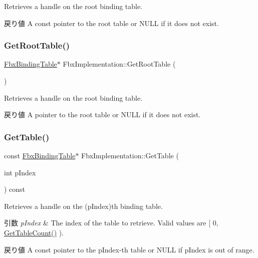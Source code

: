 Retrieves a handle on the root binding table. \begin{DoxyReturn}{戻り値}
A const pointer to the root table or N\+U\+LL if it does not exist. 
\end{DoxyReturn}
\mbox{\label{class_fbx_implementation_afc289e50527a2dfa6c977080721a8217}} 
\subsubsection{\texorpdfstring{Get\+Root\+Table()}{GetRootTable()}\hspace{0.1cm}{\footnotesize\ttfamily [2/2]}}
{\footnotesize\ttfamily \hyperlink{class_fbx_binding_table}{Fbx\+Binding\+Table}$\ast$ Fbx\+Implementation\+::\+Get\+Root\+Table (\begin{DoxyParamCaption}{ }\end{DoxyParamCaption})}

Retrieves a handle on the root binding table. \begin{DoxyReturn}{戻り値}
A pointer to the root table or N\+U\+LL if it does not exist. 
\end{DoxyReturn}
\mbox{\label{class_fbx_implementation_a0cbdb7d46ba4a42cdea6336ef859cc0a}} 
\subsubsection{\texorpdfstring{Get\+Table()}{GetTable()}\hspace{0.1cm}{\footnotesize\ttfamily [1/2]}}
{\footnotesize\ttfamily const \hyperlink{class_fbx_binding_table}{Fbx\+Binding\+Table}$\ast$ Fbx\+Implementation\+::\+Get\+Table (\begin{DoxyParamCaption}\item[{int}]{p\+Index }\end{DoxyParamCaption}) const}

Retrieves a handle on the (p\+Index)th binding table. 
\begin{DoxyParams}{引数}
{\em p\+Index} & The index of the table to retrieve. Valid values are \mbox{[} 0, \hyperlink{class_fbx_implementation_a36f67aeee13d4cc5d1523b9c36a44a50}{Get\+Table\+Count()} ). \\
\hline
\end{DoxyParams}
\begin{DoxyReturn}{戻り値}
A const pointer to the p\+Index-\/th table or N\+U\+LL if p\+Index is out of range. 
\end{DoxyReturn}
\mbox{\label{class_fbx_implementation_a854d69db6f3a3d262f5b61ca6bed1817}} 
